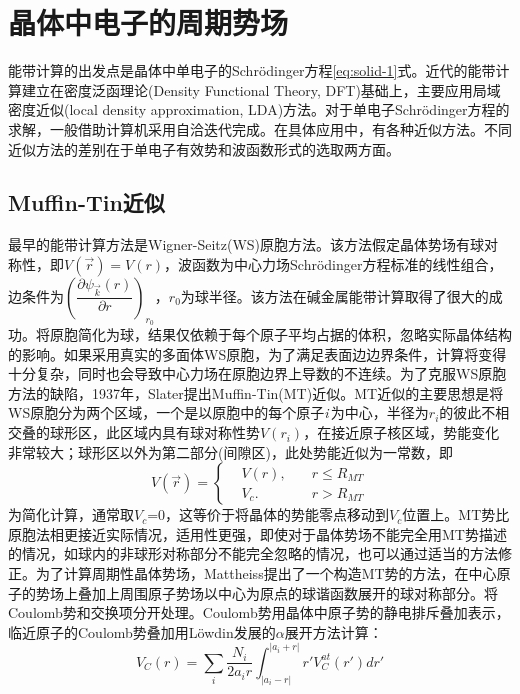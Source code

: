 \section{晶体中电子的周期势场}
能带计算的出发点是晶体中单电子的Schr\"odinger方程\eqref{eq:solid-1}式。近代的能带计算建立在密度泛函理论(Density Functional Theory, DFT)基础上，主要应用局域密度近似(local density approximation, LDA)方法。对于单电子Schr\"odinger方程的求解，一般借助计算机采用自洽迭代完成。在具体应用中，有各种近似方法。不同近似方法的差别在于单电子有效势和波函数形式的选取两方面。

\subsection{Muffin-Tin近似}
最早的能带计算方法是Wigner-Seitz(WS)原胞方法\cite{PR43-804_1933}。该方法假定晶体势场有球对称性，即$V(\vec r)=V(r)$，波函数为中心力场Schr\"odinger方程标准的线性组合，边条件为$\left(\dfrac{\partial\psi_{\vec k}(r)}{\partial r}\right)_{r_0}$，$r_0$为球半径。该方法在碱金属能带计算取得了很大的成功。将原胞简化为球，结果仅依赖于每个原子平均占据的体积，忽略实际晶体结构的影响。如果采用真实的多面体WS原胞，为了满足表面边边界条件，计算将变得十分复杂，同时也会导致中心力场在原胞边界上导数的不连续。为了克服WS原胞方法的缺陷，1937年，Slater提出Muffin-Tin(MT)近似\cite{PR51-846_1937}。MT近似的主要思想是将WS原胞分为两个区域，一个是以原胞中的每个原子{\it i}\,为中心，半径为$r_i$的彼此不相交叠的球形区，此区域内具有球对称性势$V(r_i)$，在接近原子核区域，势能变化非常较大；球形区以外为第二部分(间隙区)，此处势能近似为一常数，即
\begin{equation}
  V(\vec r)=\left\{
  \begin{aligned}
    &V(r),\quad&r\leqslant R_{MT} \\
    &V_c.&r>R_{MT}
  \end{aligned}\right.
  \label{eq:Muffin-Tin}
\end{equation}
为简化计算，通常取$V_c$=0，这等价于将晶体的势能零点移动到$V_c$位置上。MT势比原胞法相更接近实际情况，适用性更强，即使对于晶体势场不能完全用MT势描述的情况，如球内的非球形对称部分不能完全忽略的情况，也可以通过适当的方法修正。为了计算周期性晶体势场，Mattheiss提出了一个构造MT势的方法，在中心原子的势场上叠加上周围原子势场以中心为原点的球谐函数展开的球对称部分\cite{PRA133-1399_1964}。将Coulomb势和交换项分开处理。Coulomb势用晶体中原子势的静电排斥叠加表示，临近原子的Coulomb势叠加用L\"owdin发展的$\alpha$展开方法计算：
\begin{equation}
  V_C(r)=\sum_i\dfrac{N_i}{2a_ir}\int_{|a_i-r|}^{|a_i+r|}r'V_C^{at}(r')dr'
  \label{eq:lodin-alpha}
\end{equation}
